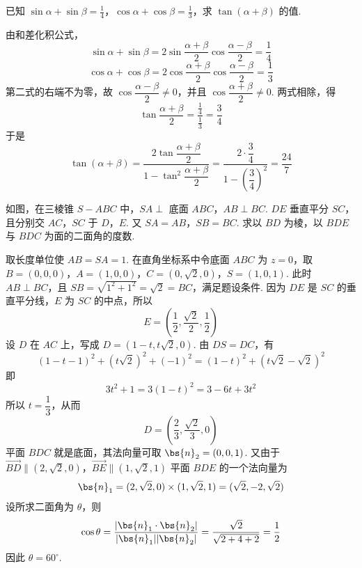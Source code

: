 \documentclass[UTF8,a4paper,oneside,11pt]{ctexbook}
\begin{document}
\begin{problem}
已知 \(\sin \alpha+\sin \beta=\frac{1}{4}\)，\(\cos \alpha+\cos \beta=\frac{1}{3}\)，求 \(\tan(\alpha+\beta)\) 的值.
\end{problem}

\begin{solution}
由和差化积公式，
\[
\sin\alpha+\sin\beta=2\sin\frac{\alpha+\beta}{2}\cos\frac{\alpha-\beta}{2}=\frac{1}{4}
\]
\[
\cos\alpha+\cos\beta=2\cos\frac{\alpha+\beta}{2}\cos\frac{\alpha-\beta}{2}=\frac{1}{3}
\]
第二式的右端不为零，故 \(\cos\dfrac{\alpha-\beta}{2}\neq0\)，并且 \(\cos\dfrac{\alpha+\beta}{2}\neq0\). 两式相除，得
\[
\tan\frac{\alpha+\beta}{2}=\frac{\frac{1}{4}}{\frac{1}{3}}=\frac{3}{4}
\]
于是
\[
\tan(\alpha+\beta)=\frac{2\tan\dfrac{\alpha+\beta}{2}}{1-\tan^2\dfrac{\alpha+\beta}{2}}
=\frac{2\cdot\dfrac{3}{4}}{1-\left(\dfrac{3}{4}\right)^2}
=\frac{24}{7}
\]
\end{solution}

\begin{problem}
如图，在三棱锥 \(S-ABC\) 中，\(SA\perp\) 底面 \(ABC\)，\(AB\perp BC\). \(DE\) 垂直平分 \(SC\)，且分别交 \(AC\)，\(SC\) 于 \(D\)，\(E\). 又 \(SA=AB\)，\(SB=BC\). 求以 \(BD\) 为棱，以 \(BDE\) 与 \(BDC\) 为面的二面角的度数.

\end{problem}

\begin{solution}
取长度单位使 \(AB=SA=1\). 在直角坐标系中令底面 \(ABC\) 为 \(z=0\)，取
\(B=(0,0,0)\)，\(A=(1,0,0)\)，\(C=(0,\sqrt{2},0)\)，\(S=(1,0,1)\).
此时 \(AB\perp BC\)，且 \(SB=\sqrt{1^2+1^2}=\sqrt{2}=BC\)，满足题设条件. 因为 \(DE\) 是 \(SC\) 的垂直平分线，\(E\) 为 \(SC\) 的中点，所以
\[
E=\left(\frac{1}{2},\frac{\sqrt{2}}{2},\frac{1}{2}\right)
\]
设 \(D\) 在 \(AC\) 上，写成 \(D=(1-t,t\sqrt{2},0)\). 由 \(DS=DC\)，有
\[
\left(1-t-1\right)^2+(t\sqrt{2})^2+(-1)^2
=\left(1-t\right)^2+(t\sqrt{2}-\sqrt{2})^2
\]
即
\[
3t^2+1=3(1-t)^2=3-6t+3t^2
\]
所以 \(t=\dfrac{1}{3}\)，从而
\[
D=\left(\frac{2}{3},\frac{\sqrt{2}}{3},0\right)
\]
平面 \(BDC\) 就是底面，其法向量可取 \(\bs{n}_2=(0,0,1)\). 又由于
\(\overrightarrow{BD}\parallel(2,\sqrt{2},0)\)，\(\overrightarrow{BE}\parallel(1,\sqrt{2},1)\)
平面 \(BDE\) 的一个法向量为
\[
\bs{n}_1=(2,\sqrt{2},0)\times(1,\sqrt{2},1)=(\sqrt{2},-2,\sqrt{2})
\]
设所求二面角为 \(\theta\)，则
\[
\cos\theta=\frac{|\bs{n}_1\cdot\bs{n}_2|}{|\bs{n}_1||\bs{n}_2|}
=\frac{\sqrt{2}}{\sqrt{2+4+2}}=\frac{1}{2}
\]
因此 \(\theta=60^\circ\).
\end{solution}
\end{document}
